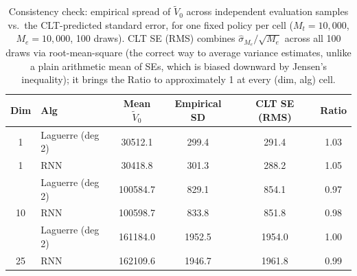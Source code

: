 \begin{table}

\caption{\label{tab:evaluation_consistency_check}Consistency check: empirical spread of $\tilde V_0$ across independent evaluation samples vs.\ the CLT-predicted standard error, for one fixed policy per cell ($M_t=10{,}000$, $M_e=10{,}000$, 100 draws). CLT SE (RMS) combines $\hat\sigma_{M_e}/\sqrt{M_e}$ across all 100 draws via root-mean-square (the correct way to average variance estimates, unlike a plain arithmetic mean of SEs, which is biased downward by Jensen's inequality); it brings the Ratio to approximately 1 at every (dim, alg) cell.}
\footnotesize
\setlength{\tabcolsep}{4pt}
\centering
\begin{tabular}[t]{clcccc}
\toprule
Dim & Alg & Mean $\tilde V_0$ & Empirical SD & CLT SE (RMS) & Ratio\\
\midrule
1 & Laguerre (deg 2) & 30512.1 & 299.4 & 291.4 & 1.03\\
1 & RNN & 30418.8 & 301.3 & 288.2 & 1.05\\
\addlinespace
10 & Laguerre (deg 2) & 100584.7 & 829.1 & 854.1 & 0.97\\
10 & RNN & 100598.7 & 833.8 & 851.8 & 0.98\\
\addlinespace
25 & Laguerre (deg 2) & 161184.0 & 1952.5 & 1954.0 & 1.00\\
25 & RNN & 162109.6 & 1946.7 & 1961.8 & 0.99\\
\bottomrule
\end{tabular}
\end{table}
